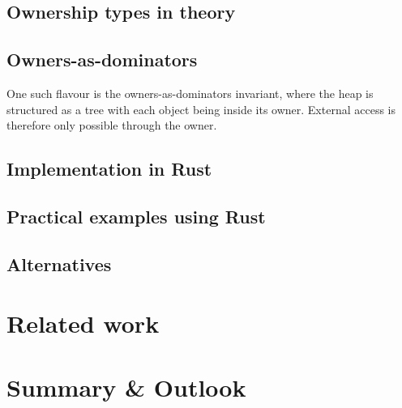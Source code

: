 \documentclass[sigplan,11pt,nonacm]{acmart}
\begin{document}
\subsection{Ownership types in theory}


\subsection{Owners-as-dominators}

One such flavour is the owners-as-dominators\cite{ownership-types-survey} invariant, where the heap is structured as a tree with each object being inside its owner.
External access is therefore only possible through the owner.



\subsection{Implementation in Rust}


\subsection{Practical examples using Rust}


\subsection{Alternatives}


\section{Related work}
\label{sec:relatedwork}


\section{Summary \& Outlook}
\label{sec:summary}




\end{document}
